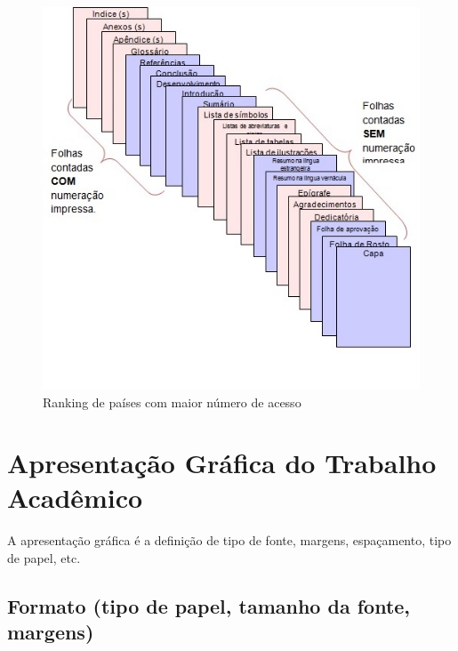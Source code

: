 \documentclass[12pt, openright, oneside, a4paper, brazil]{abntex2}
\begin{document}
\begin{figure}[htb]
	\caption{\label{ciclo}Ranking de países com maior número de acesso\hspace{10cm}}
	
	\begin{center}
		\includegraphics[scale=0.8]{images/Fig1.jpg}
	\end{center}
	\hspace{5.5cm}{Fonte: Elaboração das Autoras,2014}
\end{figure}

\section{Apresentação Gráfica do Trabalho Acadêmico}

A apresentação gráfica é a definição de tipo de fonte, margens, espaçamento, tipo de papel, etc.

\subsection{Formato (tipo de papel, tamanho da fonte, margens)}
\end{document}
